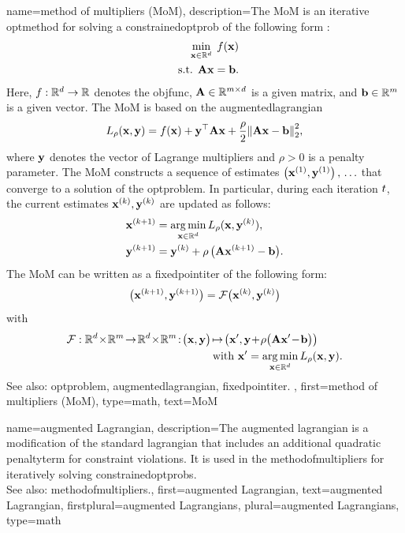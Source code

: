 {name={method of multipliers (MoM)},
	description={The MoM is an 
		iterative \gls{optmethod} for solving a \gls{constrainedoptprob} 
		of the following form \cite{DistrOptStatistLearningADMM}:
		\begin{align}
			\min_{\vx \in \mathbb{R}^{\nrfeatures}} \; f(\vx) \nonumber \\ 
			\mbox{ s.t. } \mathbf{A}\vx = \vb. \nonumber
		\end{align}
		Here, $f: \mathbb{R}^{d} \rightarrow \mathbb{R}$ denotes 
		the \gls{objfunc}, $\mathbf{A} \in \mathbb{R}^{m \times d}$ 
		is a given \gls{matrix}, and ${\bf b} \in \mathbb{R}^{m}$ is a given 
		\gls{vector}. The MoM is based on the \gls{augmentedlagrangian}
		\[L_\rho(\vx,\vy) = f(\vx) + \vy^\top \mathbf{A}\vx
		+ \frac{\rho}{2}\normgeneric{\mathbf{A}\vx - \vb}{2}^{2},
		\]
		where ${\bf y}$ denotes the \gls{vector} of Lagrange multipliers and $\rho>0$
		is a penalty \gls{parameter}. The MoM constructs a \gls{sequence} of estimates 
		$\left( {\bf x}^{(1)},{\bf y}^{(1)} \right),\,\ldots$ that converge to a solution of 
		the \gls{optproblem}. In particular, during each \gls{iteration} $t$, 
		the current estimates ${\bf x}^{(k)},{\bf y}^{(k)}$
		are updated as follows:
		\begin{align*} 
			{\bf x}^{(k+1)} &= \operatorname*{arg\,min}_{{\bf x} \in \mathbb{R}^{d}} L_\rho({\bf x},{\bf y}^{(k)}), \\
			{\bf y}^{(k+1)} &= {\bf y}^{(k)} + \rho\, \big(\mathbf{A}{\bf x}^{(k+1)} - {\bf b}\big).
		\end{align*}
		The MoM can be written as a \gls{fixedpointiter} of the following form:
		\[
		\big( {\bf x}^{(k+1)},{\bf y}^{(k+1)} \big) = \mathcal{F} \big({\bf x}^{(k)},{\bf y}^{(k)} \big)
		\]
		with 
		\begin{align} 
			\fixedpointop:\mathbb{R}^{\nrfeatures}\!\times\!\mathbb{R}^{m}\!\to\!
			\mathbb{R}^{\nrfeatures}\!\times\!\mathbb{R}^{m}\!:\!\big(\vx,\vy\big)\!&\mapsto\!\big(\vx',\vy\!+\!\rho \big(\mathbf{A}\vx'\!-\!\vb\big) \big) \nonumber \\ 
			& \mbox{ with } \vx' = \argmin_{\vx \in \mathbb{R}^{\nrfeatures}} L_\rho(\vx,\vy). \nonumber
		\end{align}
		See also: \gls{optproblem}, \gls{augmentedlagrangian}, \gls{fixedpointiter}. }, 
 	first={method of multipliers (MoM)},
 	type=math,
 	text={MoM}
}

{name={augmented Lagrangian},
	description={The augmented \gls{lagrangian} is a modification 
	 	of the standard \gls{lagrangian} that includes an additional quadratic 
		\gls{penaltyterm} for constraint violations. It is used in the \gls{methodofmultipliers} 
		for iteratively solving \glspl{constrainedoptprob}.
		\\
		See also: \gls{methodofmultipliers}.},
	first={augmented Lagrangian},
	text={augmented Lagrangian},
	firstplural={augmented Lagrangians},
	plural={augmented Lagrangians},
	type=math
}

